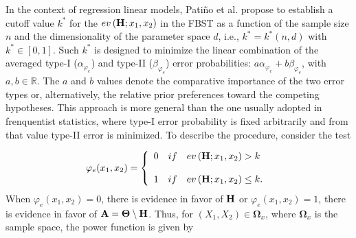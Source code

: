 \documentclass[AMA,Times1COL]{WileyNJDv5} %
\begin{document}
In the context of regression linear models, Patiño et al. \cite{Patino-23} propose to establish a cutoff value $k^*$ for the $ev\left(\text{\textbf{H}};x_{1},x_{2}\right)$ in the FBST as a function of the sample size $n$ and the dimensionality of the parameter space $d$, i.e., $ k^*= k^*(n,d)$ with $k^*\in [0,1]$. Such $k^*$ is designed to minimize the linear combination of the averaged type-I ($\alpha_{\varphi_{e}}$) and type-II ($\beta_{\varphi_{e}}$) error probabilities: $a\alpha_{\varphi_{e}}+b\beta_{\varphi_{e}}$, with $a, b \in \mathbb{R}$. The $a$ and $b$ values denote the comparative importance of the two error types or, alternatively, the relative prior preferences toward the competing hypotheses. This approach is more general than the one usually adopted in frenquentist statistics, where type-I error probability is fixed arbitrarily and from that value type-II error is minimized. To describe the procedure, consider the test

\begin{equation*}
\varphi_{e}(x_{1},x_{2})= \left\{ \begin{array}{l}  0 \quad if \quad ev\left(\text{\textbf{H}};x_{1},x_{2}\right)> k\\ \\ 1 \quad if \quad ev\left(\text{\textbf{H}};x_{1},x_{2}\right)\leq 
k.  \end{array} \right.\;
\end{equation*}When $\varphi_{e}(x_{1},x_{2})=0$, there is evidence in favor of $\text{\textbf{H}}$ or $\varphi_{e}(x_{1},x_{2})=1$, there is evidence in favor of $\text{\textbf{A}}=\boldsymbol{\Theta}\setminus \text{\textbf{H}}$.  Thus, for $(X_{1}, X_{2}) \in \boldsymbol{\Omega}_{x}$, where $\boldsymbol{\Omega}_{x}$ is the sample space, the power function is given by
\end{document}
